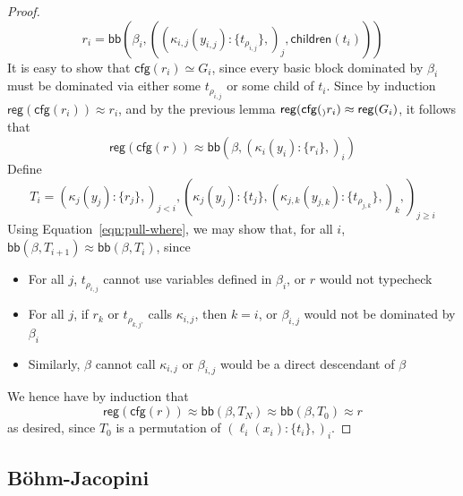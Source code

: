 \documentclass[acmsmall,screen,review]{acmart}
\newcommand{\ms}[1]{\ensuremath{\mathsf{#1}}}
\newcommand{\lto}{:}
\newcommand{\wbranch}[3]{#1(#2) \lto \{#3\}}
\newcommand{\teqv}{\approx}
\newcommand{\todom}[1]{\ms{children}(#1)}
\newcommand{\tocfg}[1]{\ms{cfg}(#1)}
\newcommand{\adddom}[2]{\ms{bb}(#1, #2)}
\newcommand{\toreg}[1]{\ms{reg}(#1)}
\begin{document}
\begin{proof}
\begin{equation}
    r_i = \adddom{\beta_i}{
      ((\wbranch{\kappa_{i, j}}{y_{i, j}}{t_{\rho_{i, j}}},)_j, \todom{t_i})
    }
  \end{equation}
  It is easy to show that $\tocfg{r_i} \simeq G_i$, since every basic block dominated by $\beta_i$
  must be dominated via either some $t_{\rho_{i, j}}$ or some child of $t_i$. Since by induction
  $\toreg{\tocfg{r_i}} \teqv r_i$, and by the previous lemma $\toreg{\tocfg_r_i} \teqv \toreg{G_i}$,
  it follows that
  \begin{equation}
    \toreg{\tocfg{r}}
    \teqv \adddom{\beta}{(\wbranch{\kappa_i}{y_i}{r_i},)_i}
  \end{equation}
  Define
  \begin{equation}
    T_i = (\wbranch{\kappa_j}{y_j}{r_j},)_{j < i}, 
      (\wbranch{\kappa_j}{y_j}{t_j}, 
      (\wbranch{\kappa_{j, k}}{y_{j, k}}{t_{\rho_{j, k}}},)_k,)_{j \geq i}
  \end{equation}
  Using Equation~\ref{eqn:pull-where}, we may show that, for all $i$, $\adddom{\beta}{T_{i + 1}}
  \teqv \adddom{\beta}{T_i}$, since
  \begin{itemize}
    \item For all $j$, $t_{\rho_{i, j}}$ cannot use variables defined in $\beta_i$, or $r$ would not
    typecheck
    \item For all $j$, if $r_k$ or $t_{\rho_{k, j'}}$ calls $\kappa_{i, j}$, then $k = i$, or
    $\beta_{i, j}$ would not be dominated by $\beta_i$
    \item Similarly, $\beta$ cannot call $\kappa_{i, j}$ or $\beta_{i, j}$ would be a direct
    descendant of $\beta$
  \end{itemize}
  We hence have by induction that
  \begin{equation}
    \toreg{\tocfg{r}} \teqv \adddom{\beta}{T_N} \teqv \adddom{\beta}{T_0} \teqv r
  \end{equation}
  as desired, since $T_0$ is a permutation of $(\wbranch{\ell_i}{x_i}{t_i},)_i$.
\end{proof}

\subsection{B\"ohm-Jacopini}
\end{document}
